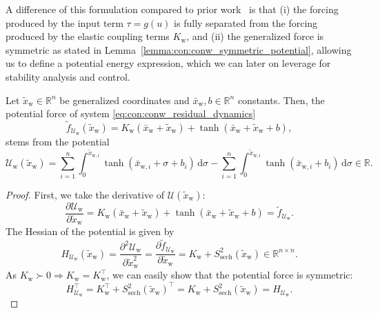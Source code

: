 A difference of this formulation compared to prior work~\citep{rusch2020coupled, rusch2021unicornn, ceni2024random, lanthaler2024neural} is that (i) the forcing produced by the input term $\tau = g(u)$ is fully separated from the forcing produced by the elastic coupling terms $K_\mathrm{w}$, and (ii) the generalized force is symmetric as stated in Lemma~\ref{lemma:con:conw_symmetric_potential}, allowing us to define a potential energy expression, which we can later on leverage for stability analysis and control.

\begin{lemma}\label{lemma:con:conw_symmetric_potential}
    Let $\tilde{x}_\mathrm{w} \in \mathbb{R}^n$ be generalized coordinates and $\bar{x}_\mathrm{w}, b \in \mathbb{R}^n$ constants.
    Then, the potential force of system \eqref{eq:con:conw_residual_dynamics}
    \begin{equation}
        \tilde{f}_{\mathcal{U}_\mathrm{w}}(\tilde{x}_\mathrm{w}) = K_\mathrm{w} (\bar{x}_\mathrm{w} + \tilde{x}_\mathrm{w}) + \tanh(\bar{x}_\mathrm{w} + \tilde{x}_\mathrm{w} + b),
    \end{equation}
    stems from the potential
    \begin{equation}
        \mathcal{U}_\mathrm{w}(\tilde{x}_\mathrm{w}) = \sum_{i=1}^n \int_{0}^{\tilde{x}_{\mathrm{w},i}} \tanh(\bar{x}_{\mathrm{w},i}+\sigma+b_i) \, \mathrm{d} \sigma - \sum_{i=1}^n \int_{0}^{\tilde{x}_{\mathrm{w},i}} \tanh(\bar{x}_{\mathrm{w},i}+b_i) \, \mathrm{d} \sigma \in \mathbb{R}.
    \end{equation}
\end{lemma}
\begin{proof}
    First, we take the derivative of $\mathcal{U}(\tilde{x}_\mathrm{w})$:
    \begin{equation}
        \frac{\partial \mathcal{U}_\mathrm{w}}{\partial \tilde{x}_\mathrm{w}} = K_\mathrm{w} (\bar{x}_\mathrm{w} + \tilde{x}_\mathrm{w}) + \tanh(\bar{x}_\mathrm{w} + \tilde{x}_\mathrm{w} + b) = \tilde{f}_{\mathcal{U}_\mathrm{w}}.
    \end{equation}
    The Hessian of the potential is given by
    \begin{equation}
        H_{\mathcal{U}_\mathrm{w}}(\tilde{x}_\mathrm{w}) = \frac{\partial^2 \mathcal{U}_\mathrm{w}}{\partial \tilde{x}_\mathrm{w}^2} = \frac{\partial \tilde{f}_{\mathcal{U}_\mathrm{w}}}{\partial \tilde{x}_\mathrm{w}}  = K_\mathrm{w} + S_\mathrm{sech}^{2}(\tilde{x}_\mathrm{w}) \in \mathbb{R}^{n \times n}.
    \end{equation}
    As $K_\mathrm{w} \succ 0 \Rightarrow K_\mathrm{w} = K_\mathrm{w}^\top$, we can easily show that the potential force is symmetric:
    \begin{equation}
        H_{\mathcal{U}_\mathrm{w}}^\top = K_\mathrm{w}^\top  + S_\mathrm{sech}^{2}(\tilde{x}_\mathrm{w})^\top = K_\mathrm{w} + S_\mathrm{sech}^{2}(\tilde{x}_\mathrm{w}) = H_{\mathcal{U}_\mathrm{w}}.
    \end{equation}
\end{proof}

